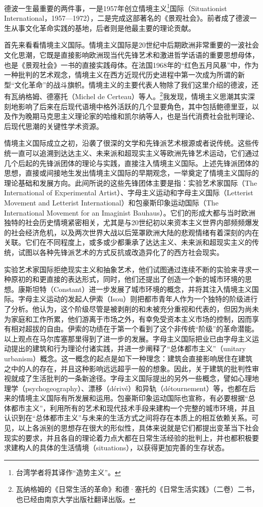 \documentclass[fontset=fandol, a4paper, 12pt, openright]{ctexbook}
\begin{document}
德波一生最重要的两件事，一是1957年创立情境主义\footnote{台湾学者将其译作“造势主义”。}国际（Situationist International，1957—1972），二是完成这部著名的《景观社会》。前者成了德波一生从事文化革命实践的基地，后者则是他最主要的理论贡献。

首先来看看情境主义国际。情境主义国际是20世纪中后期欧洲非常重要的一波社会文化思潮，它既是直接影响欧洲现当代先锋艺术和激进哲学话语的重要思想母体，也是《景观社会》一书的直接实践母体。在法国1968年的“红色五月风暴”中，作为一种批判的艺术观念，情境主义在西方近现代历史进程中第一次成为所谓的新型“文化革命”的战斗旗帜。情境主义的主要代表人物除了我们这里介绍的德波，还有瓦纳格姆、德塞托（Michel de Certeau）等人。\footnote{瓦纳格姆的《日常生活的革命》和德·塞托的《日常生活实践》（二卷）二书，也已经由南京大学出版社翻译出版。}我发现，情境主义思潮其实深刻地影响了后来在后现代语境中格外活跃的几个显要角色，其中包括鲍德里亚，以及作为晚期马克思主义理论家的哈维和凯尔纳等人，也是当代消费社会批判理论、后现代思潮的关键性学术资源。

情境主义国际成立之初，沿袭了很深的文学和先锋派艺术根源或者说传统。这些传统一直可以追溯到达达主义、未来派和超现实主义等欧洲先锋艺术运动，它们通过几个后起的先锋派团体的理论与实践，直接注入情境主义国际。上述先锋派团体的思想，直接或间接地生发出情境主义国际的早期观念，一举奠定了情境主义国际的理论基础和发展方向。此间所说的这些先锋团体主要是指：实验艺术家国际（The International of Experimental Artist）、字母主义运动和字母主义国际（Letterist Movement and Letterist International）和包豪斯印象运动国际（The International Movement for an Imaginist Bauhaus）。它们的形成大都与当时欧洲独特的社会历史情境紧密相关，尤其是与20世纪初以来资本主义世界内部频频爆发的社会经济危机，以及两次世界大战以后笼罩欧洲大陆的悲观情绪有着深刻的内在关联。它们在不同程度上，或多或少都秉承了达达主义、未来派和超现实主义的传统，试图以各种先锋派艺术的方式反抗或改造异化了的西方社会现实。

实验艺术家国际拒绝现实主义和抽象艺术，他们试图通过连续不断的实验来寻求一种原初的和更直接的表达形式，同时，他们还提出了创造一个新的城市环境的思想。康斯坦特（Constant）进一步发展了城市环境的概念，并将其注入情境主义国际。字母主义运动的发起人伊索（Isou）则把都市青年人作为一个独特的阶级进行了分析。他认为，这个阶级尽管是被剥削的和未被充分重视和代表的，但因为尚未为家庭和工作所累，他们游离于市场之外，有幸免受资本主义市场的控制，因而享有相对超拔的自由。伊索的功绩在于第一个看到了这个非传统“阶级”的革命潜能。以上观点在马尔库塞那里得到了进一步的发展。字母主义国际把业已由字母主义运动提出的建筑和行为理论付诸实践，并进一步阐释了“总体都市主义”（unitary urbanism）概念。这一概念的起点是如下一种理念：建筑会直接影响居住在建筑之中的人的存在，并且这种影响远远超乎一般的想象。因此，关于建筑的批判性审视就成了生活批判的一条新途径。字母主义国际提出的另外一些概念，譬如心理地理学（psychogeography）、漂移（dérivé）和异轨（détournement）等，也都在后来的情境主义国际有所发展和运用。包豪斯印象运动国际也宣称，有必要根据“总体都市主义”，利用所有的艺术和现代技术手段来建构一个完整的城市环境，并且认识到在“总体都市主义”与未来的生活方式之间将存在本质上的相互依赖关系。可见，以上各派别的思想存在很大的形似性，具体来说就是它们都提出变革当下社会现实的要求，并且各自的理论着力点大都在日常生活经验的批判上，并也都积极要求建构人的具体的生活情境（situations），以获得更加完善的生存状态。
\end{document}
